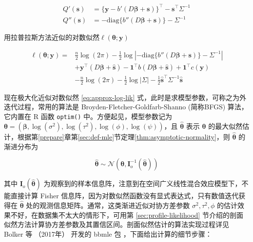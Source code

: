 \documentclass[12pt,a4paper,UTF8,twoside]{book}
\theoremstyle{definition}
\theoremstyle{definition}
\theoremstyle{definition}
\theoremstyle{remark}
\begin{document}
\begin{align}
Q'(\mathbf{s})& =  \{\mathbf{y} - b'(D\boldsymbol{\beta} + \mathbf{s}) \}^{\top} - \mathbf{s}^{\top}\Sigma^{-1} \label{eq:first-deriv} \\
Q''(\mathbf{s})& =  -\mathrm{diag} \{b''(D\boldsymbol{\beta} + \mathbf{s}) \} - \Sigma^{-1} \label{eq:second-deriv}
\end{align}

\noindent 用拉普拉斯方法近似的对数似然\(\ell(\boldsymbol{\theta};\mathbf{y})\)

\begin{equation}
\begin{aligned}
\ell(\boldsymbol{\theta};\mathbf{y}) = {} & \frac{n}{2}\log (2\pi) -\frac{1}{2}\log | -\mathrm{diag} \{b''(D\boldsymbol{\beta} + \mathbf{s}) \} - \Sigma^{-1} |  \\
& + \mathbf{y}^{\top} (D\boldsymbol{\beta} + \hat{\mathbf{s}}) - \mathbf{1}^{\top} b( D\boldsymbol{\beta} + \hat{\mathbf{s}}) + \mathbf{1}^{\top} c(\mathbf{y}) \\
& - \frac{n}{2}\log (2\pi) -\frac{1}{2}\log |\Sigma| -\frac{1}{2}\hat{\mathbf{s}}^{\top} \Sigma^{-1} \hat{\mathbf{s}}
\end{aligned} \label{eq:approx-log-lik}
\end{equation}

\noindent 现在极大化近似对数似然 \eqref{eq:approx-log-lik} 式，此时是求模型参数，可称之为外迭代过程，常用的算法是 Broyden-Fletcher-Goldfarb-Shanno (简称BFGS) 算法，它内置在 R 函数 \texttt{optim()} 中。方便起见，模型参数记为 \(\boldsymbol{\theta} = (\boldsymbol{\beta},\log(\sigma^2),\log(\tau^2),\log(\phi),\log(\psi))\)，且 \(\hat{\boldsymbol{\theta}}\) 表示 \(\boldsymbol{\theta}\) 的最大似然估计，根据第\ref{prepare}章第\ref{sec:def-mle}节定理\ref{thm:asymptotic-normality}，则 \(\hat{\boldsymbol{\theta}}\) 的渐进分布为

\[ \hat{\boldsymbol{\theta}} \sim \mathcal{N}(\boldsymbol{\theta}, \mathbf{I}_{o}^{-1}(\hat{\boldsymbol{\theta}})) \]

\noindent 其中 \(\mathbf{I}_{o}(\hat{\boldsymbol{\theta}})\) 为观察到的样本信息阵，注意到在空间广义线性混合效应模型下，不能直接计算 Fisher 信息阵，因为对数似然函数没有显式表达式，只有数值迭代获得在 \(\hat{\boldsymbol{\theta}}\) 处的观测信息矩阵。通常，这类渐进近似对协方差参数 \(\sigma^2, \tau^2, \phi\) 的估计效果不好，在数据集不太大的情形下，可用第 \ref{sec:profile-likelihood} 节介绍的剖面似然方法计算协方差参数及其置信区间。剖面似然估计的算法实现过程详见 Bolker 等 （2017年） 开发的 bbmle 包 \citep{R-bbmle}，下面给出计算的细节步骤：
\end{document}
